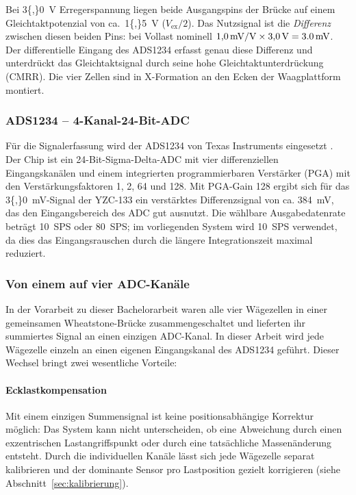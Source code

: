 \documentclass[12pt,a4paper]{article}
\begin{document}
	Bei \SI{3{,}0}{\volt} Erregerspannung liegen beide Ausgangspins der Brücke auf einem Gleichtaktpotenzial von ca.\ \SI{1{,}5}{\volt} ($V_{\text{ex}}/2$).
	Das Nutzsignal ist die \emph{Differenz} zwischen diesen beiden Pins: bei Vollast nominell $1{,}0\,\text{mV/V} \times 3{,}0\,\text{V} = \SI{3{,}0}{\milli\volt}$.
	Der differentielle Eingang des ADS1234 erfasst genau diese Differenz und unterdrückt das Gleichtaktsignal durch seine hohe Gleichtaktunterdrückung (CMRR).
	Die vier Zellen sind in X-Formation an den Ecken der Waagplattform montiert.

	\subsubsection{ADS1234 -- 4-Kanal-24-Bit-ADC}

	Für die Signalerfassung wird der ADS1234 von Texas Instruments eingesetzt \cite{ads1234_datasheet}.
	Der Chip ist ein 24-Bit-Sigma-Delta-ADC mit vier differenziellen Eingangskanälen und einem integrierten programmierbaren Verstärker (PGA) mit den Verstärkungsfaktoren 1, 2, 64 und 128.
	Mit PGA-Gain 128 ergibt sich für das \SI{3{,}0}{\milli\volt}-Signal der YZC-133 ein verstärktes Differenzsignal von ca. \SI{384}{\milli\volt}, das den Eingangsbereich des ADC gut ausnutzt.
	Die wählbare Ausgabedatenrate beträgt 10~SPS oder 80~SPS; im vorliegenden System wird 10~SPS verwendet, da dies das Eingangsrauschen durch die längere Integrationszeit maximal reduziert.

	\subsubsection{Von einem auf vier ADC-Kanäle}

	In der Vorarbeit zu dieser Bachelorarbeit waren alle vier Wägezellen in einer gemeinsamen Wheatstone-Brücke zusammengeschaltet und lieferten ihr summiertes Signal an einen einzigen ADC-Kanal.
	In dieser Arbeit wird jede Wägezelle einzeln an einen eigenen Eingangskanal des ADS1234 geführt.
	Dieser Wechsel bringt zwei wesentliche Vorteile:

	\paragraph{Ecklastkompensation}
	Mit einem einzigen Summensignal ist keine positionsabhängige Korrektur möglich: Das System kann nicht unterscheiden, ob eine Abweichung durch einen exzentrischen Lastangriffspunkt oder durch eine tatsächliche Massenänderung entsteht.
	Durch die individuellen Kanäle lässt sich jede Wägezelle separat kalibrieren und der dominante Sensor pro Lastposition gezielt korrigieren (siehe Abschnitt~\ref{sec:kalibrierung}).
\end{document}
